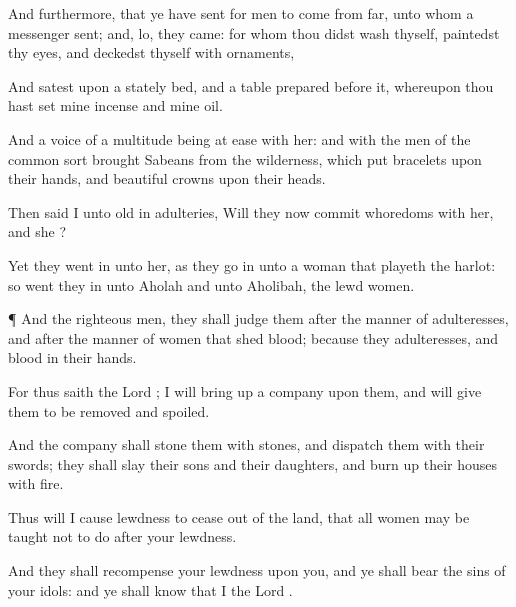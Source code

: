 {And
furthermore, that ye have
sent for
men to
come from
far, unto whom a
messenger
{}
sent; and, lo, they
came: for whom thou didst
wash thyself,
paintedst thy
eyes, and
deckedst thyself with
ornaments,

And
satest upon a
stately
bed, and a
table
prepared
before it, whereupon thou hast
set mine
incense and mine
oil.

And a
voice of a
multitude being at
ease
{} with her: and with the
men of the common
sort
{}
brought
Sabeans from the
wilderness, which
put
bracelets upon their
hands, and
beautiful
crowns upon their
heads.

Then
said I unto
{}
old in
adulteries, Will they now
commit
whoredoms with her, and she
{}?

Yet they went
in unto her, as they go
in unto a
woman that playeth the
harlot: so went they
in unto
Aholah and unto
Aholibah, the
lewd
women.


\par }{\PP {}¶ And the
righteous
men, they shall
judge them after the
manner of
adulteresses, and after the
manner of women that
shed
blood; because they
{}
adulteresses, and
blood
{} in their
hands.

For thus
saith the
Lord
{}; I will bring
up a
company upon them, and will
give them to be
removed and
spoiled.

And the
company shall
stone them with
stones, and
dispatch them with their
swords; they shall
slay their
sons and their
daughters, and burn
up their
houses with
fire.

Thus will I cause
lewdness to
cease out of the
land, that all
women may be
taught not to
do after your
lewdness.

And they shall
recompense your
lewdness upon you, and ye shall
bear the
sins of your
idols: and ye shall
know that I
{} the
Lord
{}.




\par }
